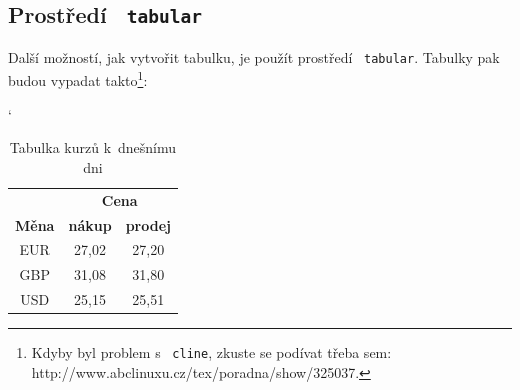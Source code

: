 \documentclass[11pt,a4paper,titlepage]{article}
\begin{document}
\subsection{Prostředí \ \texttt{tabular}}
Další možností, jak vytvořit tabulku, je použít prostředí \ \texttt{tabular}. Tabulky pak budou vypadat 
takto\footnote{Kdyby byl problem s \ \texttt{cline}, zkuste se podívat třeba sem: http://www.abclinuxu.cz/tex/poradna/show/325037.\vspace*{\fill}}:
\bigskip
\begin{table}[h]
	\begin{center}
	\catcode `
		\begin{tabular}{|c|c|c|}\hline
			&\multicolumn{2}{|c|}{\bfseries Cena} \\
			\cline{2-3}
			\textbf {Měna} & \textbf {nákup} & \textbf {prodej} \\ \hline
			EUR & 27,02 & 27,20 \\
			GBP & 31,08 & 31,80 \\
			USD & 25,15 & 25,51 \\ \hline
		\end{tabular}
	\caption{Tabulka kurzů k~dnešnímu dni}
	\label{table:1}
	\end{center}
\end{table}
\end{document}
